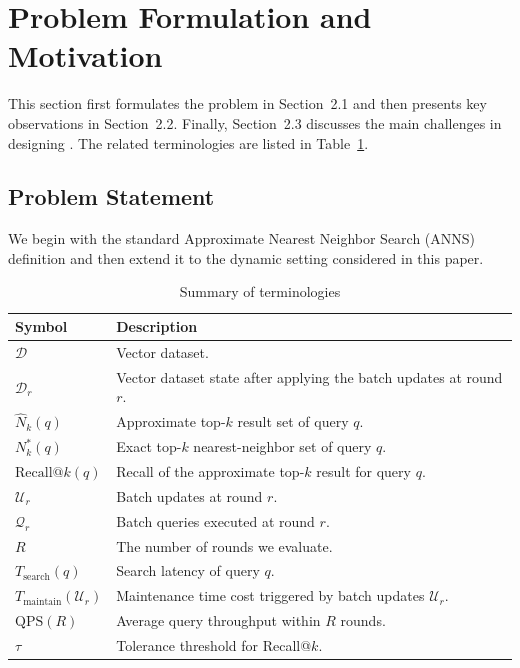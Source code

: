 \section{Problem Formulation and Motivation}
This section first formulates the problem in Section~2.1 and then presents key observations in Section~2.2. Finally, Section~2.3 discusses the main challenges in designing \system. The related terminologies are listed in Table~\ref{tab:symbols}.

\subsection{Problem Statement}

We begin with the standard Approximate Nearest Neighbor Search (ANNS) definition and then extend it to the dynamic setting considered in this paper.

\begin{table}[t]
  \caption{Summary of terminologies}
  \label{tab:symbols}
  \begin{tabular}{lp{6.3cm}}
    \toprule
    Symbol & Description\\
    \midrule
    $\mathcal{D}$ & Vector dataset. \\
    $\mathcal{D}_r$ & Vector dataset state after applying the batch updates at round $r$. \\
    $\widehat{N}_k(q)$ & Approximate top-$k$ result set of query $q$. \\
    $N_k^{\ast}(q)$ & Exact top-$k$ nearest-neighbor set of query $q$. \\
    $\mathrm{Recall@}k(q)$ & Recall of the approximate top-$k$ result for query $q$. \\
    $\mathcal{U}_r$ & Batch updates at round $r$. \\
    $\mathcal{Q}_r$ & Batch queries executed at round $r$. \\
	$R$ & The number of rounds we evaluate. \\
    $T_{\mathrm{search}}(q)$ & Search latency of query $q$. \\
    $T_{\mathrm{maintain}}(\mathcal{U}_r)$ & Maintenance time cost triggered by batch updates $\mathcal{U}_r$. \\
    $\mathrm{QPS}(R)$ & Average query throughput within $R$ rounds. \\
    $\tau$ & Tolerance threshold for Recall@$k$. \\
    \bottomrule
  \end{tabular}
\end{table}

